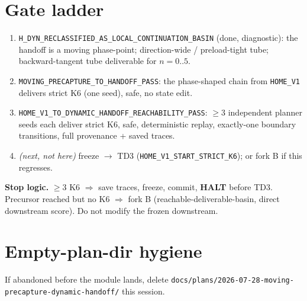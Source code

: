 \documentclass[11pt]{article}
\newcommand{\code}[1]{\texttt{\small #1}}
\newcommand{\halt}{\textcolor{red!70!black}{\textbf{HALT}}}
\begin{document}
\section{Gate ladder}
\begin{enumerate}[nosep,leftmargin=1.6em]
  \item \code{H\_DYN\_RECLASSIFIED\_AS\_LOCAL\_CONTINUATION\_BASIN} (done, diagnostic): the handoff is a moving
  phase-point; direction-wide / preload-tight tube; backward-tangent tube deliverable for $n{=}0..5$.
  \item \code{MOVING\_PRECAPTURE\_TO\_HANDOFF\_PASS}: the phase-shaped chain from \code{HOME\_V1} delivers strict K6
  (one seed), safe, no state edit.
  \item \code{HOME\_V1\_TO\_DYNAMIC\_HANDOFF\_REACHABILITY\_PASS}: $\ge3$ independent planner seeds each deliver strict
  K6, safe, deterministic replay, exactly-one boundary transitions, full provenance + saved traces.
  \item \emph{(next, not here)} freeze $\to$ TD3 (\code{HOME\_V1\_START\_STRICT\_K6}); or fork B if this regresses.
\end{enumerate}
\textbf{Stop logic.} $\ge3$ K6 $\Rightarrow$ save traces, freeze, commit, \halt{} before TD3. Precursor reached but no
K6 $\Rightarrow$ fork B (reachable-deliverable-basin, direct downstream score). Do not modify the frozen downstream.

\section{Empty-plan-dir hygiene}
If abandoned before the module lands, delete \code{docs/plans/2026-07-28-moving-precapture-dynamic-handoff/} this session.
\end{document}
